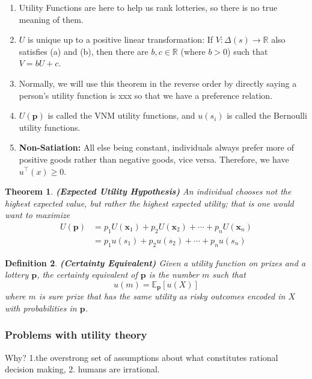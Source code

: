 \documentclass[13pt]{article}
\newtheorem{theorem}{Theorem}[section]
\newtheorem{definition}[theorem]{Definition}
\theoremstyle{definition}
\theoremstyle{remark}
\newenvironment{remark}
  {\pushQED{\qed}\renewcommand{\qedsymbol}{$\triangle$}\remarkx}
  {\popQED\endremarkx}
\newcommand{\EE}{\mathbb{E}}
\begin{document}
\begin{remark}\hfill
\begin{enumerate}
    \item Utility Functions are here to help us rank lotteries, so there is no true meaning of them. 
    \item $U$ is unique up to a positive linear transformation: If $V:\Delta(s)\rightarrow\mathbb{R}$ also satisfies (a) and (b), then there are $b,c\in\mathbb{R}$ (where $b > 0$) such that $V = bU + c$.
    \item {\color{C3}Normally, we will use this theorem in the reverse order by directly saying a person's utility function is xxx so that we have a preference relation.}
    \item $U(\mathbf{p})$ is called the VNM utility functions, and $u(s_i)$ is called the Bernoulli utility functions.
    \item \textbf{Non-Satiation: } All else being constant, individuals always prefer more of positive goods rather than negative goods, vice versa. Therefore, we have $u^{\top}(x) \geq 0$.
\end{enumerate}
\end{remark}


\begin{theorem}\textbf{(Expected Utility Hypothesis)}  An individual chooses not the highest expected value, but rather the highest expected utility; that is one would want to maximize
\begin{align*}
        U(\mathbf{p}) &= p_1U(\mathbf{x}_1)+p_2U(\mathbf{x}_2)+\cdots + p_nU(\mathbf{x}_n)\\
        &=p_1u(s_1)+p_2u(s_2)+\cdots + p_nu(s_n)
    \end{align*}
\end{theorem}



\begin{definition}\textbf{(Certainty Equivalent)} Given a utility function on prizes and a lottery $\mathbf{p}$, the certainty equivalent of $\mathbf{p}$ is the number $m$ such that
\[ u(m)=\EE_{\mathbf{p}}[u(X)]
\]
where $m$ is sure prize that has the same utility as risky outcomes encoded in $X$ with probabilities in $\mathbf{p}$. 
\end{definition}

\subsubsection{Problems with utility theory}
Why? 1.the overstrong set of assumptions about what constitutes rational decision making, 2. humans are irrational.
\end{document}
